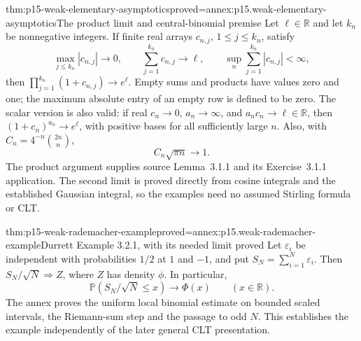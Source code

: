 \begin{hblemma}{thm:p15-weak-elementary-asymptotics}{proved=annex:p15.weak-elementary-asymptotics}{The product limit and central-binomial premise}
Let \(\ell\in\mathbb R\) and let \(k_n\) be nonnegative integers.
If finite real arrays
\(c_{n,j}\), \(1\leq j\leq k_n\), satisfy
\[
 \max_{j\leq k_n}|c_{n,j}|\to0,\qquad
 \sum_{j=1}^{k_n}c_{n,j}\to\ell,\qquad
 \sup_n\sum_{j=1}^{k_n}|c_{n,j}|<\infty,
\]
then \(\prod_{j=1}^{k_n}(1+c_{n,j})\to e^\ell\).
Empty sums and products have values zero and one; the maximum
absolute entry of an empty row is defined to be zero.
The scalar version is also valid: if real \(c_n\to0\),
\(a_n\to\infty\), and \(a_nc_n\to\ell\in\mathbb R\), then
\((1+c_n)^{a_n}\to e^\ell\), with positive bases for all
sufficiently large \(n\).
Also, with \(C_n=4^{-n}\binom{2n}{n}\),
\[
 C_n\sqrt{\pi n}\longrightarrow1.
\]
The product argument supplies source Lemma~3.1.1 and its
Exercise~3.1.1 application. The second limit is proved directly
from cosine integrals and the established Gaussian integral,
so the examples need no assumed Stirling formula or CLT.
\end{hblemma}

\begin{hbtheorem}{thm:p15-weak-rademacher-example}{proved=annex:p15.weak-rademacher-example}{Durrett Example 3.2.1, with its needed limit proved}
Let \(\varepsilon_i\) be independent with probabilities \(1/2\)
at \(1\) and \(-1\), and put \(S_N=\sum_{i=1}^N\varepsilon_i\).
Then \(S_N/\sqrt N\Rightarrow Z\), where \(Z\) has density
\(\phi\). In particular,
\[
 \mathbb P(S_N/\sqrt N\leq x)\longrightarrow\Phi(x)
                                \qquad(x\in\mathbb R).
\]
The annex proves the uniform local binomial estimate on bounded
scaled intervals, the Riemann-sum step and the passage to odd \(N\).
This establishes the example independently of the later general
CLT presentation.
\end{hbtheorem}

